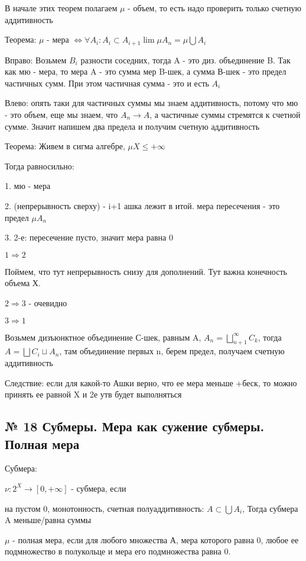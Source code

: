 \documentclass{article}
\begin{document}
В начале этих теорем полагаем $\mu$ - объем, то есть надо проверить только счетную аддитивность

Теорема: $\mu$ - мера $\Leftrightarrow \forall A_i : A_{i} \subset A_{i + 1} \lim{\mu A_n} = \mu \bigcup{A_i}$ 

Вправо: Возьмем $B_i$ разности соседних, тогда A - это диз. объединение B. 
Так как мю - мера, то мера A - это сумма мер  B-шек, а сумма В-шек - это предел частичных сумм. При этом частичная сумма - это и есть $A_i$

Влево: опять таки для частичных суммы мы знаем аддитивность, потому что мю - это объем, еще мы знаем, что $A_n \rightarrow A$, а частичные суммы стремятся к счетной сумме. Значит напишем два предела и получим счетную аддитивность

Теорема: Живем в сигма алгебре, $\mu X \leq +\infty$

Тогда равносильно:

1. мю - мера

2. (непрерывность сверху) - i+1 ашка лежит в итой. мера пересечения - это предел $\mu A_n$

3. 2-е: пересечение пусто, значит мера равна 0

$1 \Rightarrow 2$

Поймем, что тут непрерывность снизу для дополнений. Тут важна конечность объема Х.

$2 \Rightarrow 3$ - очевидно

$3 \Rightarrow 1$

Возьмем дизъюнктное объединение С-шек, равным A, $A_n = \bigsqcup\limits_{n + 1}^\infty{C_k}$, тогда $A = \bigsqcup{C_i} \sqcup A_n$, там объединение первых n, берем предел, получаем счетную аддитивность

Следствие: если для какой-то Ашки верно, что ее мера меньше +беск, то можно принять ее равной X и 2е утв будет выполняться

\subsection{ \footnotesize № 18 Субмеры. Мера как сужение субмеры. Полная мера}

Субмера:

$\nu : 2^X \rightarrow [0, +\infty]$ - субмера, если

на пустом 0, монотонность, счетная полуаддитивность: $A \subset \bigcup{A_i}$, Тогда субмера A меньше/равна суммы

$\mu$ - полная мера, если для любого множества А, мера которого равна 0, любое ее подмножество в полукольце и мера его подмножества равна 0.
\end{document}
